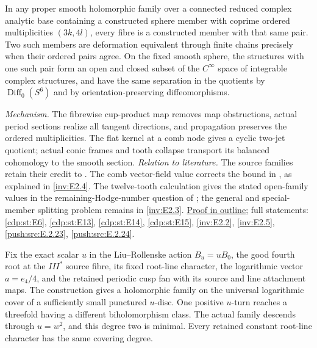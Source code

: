 \begin{maintheorem}
In any proper smooth holomorphic family over a connected reduced
complex analytic base containing a constructed sphere member with
coprime ordered multiplicities $(3k,4l)$, every fibre is a
constructed member with that same pair. Two such members are
deformation equivalent through finite chains precisely when their
ordered pairs agree. On the fixed smooth sphere, the structures
with one such pair form an open and closed subset of the
$C^\infty$ space of integrable complex structures, and have the
same separation in the quotients by $\operatorname{Diff}_0(S^6)$
and by orientation-preserving diffeomorphisms.

\end{maintheorem}

\textit{Mechanism.} The fibrewise cup-product map removes map
obstructions, actual period sections realize all tangent
directions, and propagation preserves the ordered multiplicities.
The flat kernel at a comb node gives a cyclic two-jet quotient;
actual conic frames and tooth collapse transport its balanced
cohomology to the smooth section.
\textit{Relation to literature.} The source families retain their
credit to \cite{Viaclovsky2026Two,LiuRollenske2026,Viaclovsky2026Combs}.
The comb vector-field value corrects the bound in
\cite[Corollary~1.3, p.~2]{HKP2000}, as explained in
\ref{inv:E2.4}.
The twelve-tooth calculation gives the stated open-family values
in the remaining-Hodge-number question of
\cite[Section~10(2)]{Viaclovsky2026Combs}; the general and
special-member splitting problem remains in \ref{inv:E2.3}.
\hyperlink{outline-II-F}{Proof in outline}; full statements:
\ref{cdp:st:E6}, \ref{cdp:st:E13}, \ref{cdp:st:E14},
\ref{cdp:st:E15}, \ref{inv:E2.2}, \ref{inv:E2.5},
\ref{push:src:E.2.23}, \ref{push:src:E.2.24}.

\hypertarget{main-II-G}{}
\begin{maintheorem}
\hypertarget{tag-03K8}{}\label{series:II:G}

Fix the exact scalar $u$ in the Liu--Rollenske action $B_u=uB_0$,
the good fourth root at the $III^*$ source fibre, its fixed
root-line character, the logarithmic vector $a=e_4/4$, and the
retained periodic cusp fan with its source and line attachment
maps. The construction gives a holomorphic family on the universal
logarithmic cover of a sufficiently small punctured $u$-disc.
One positive $u$-turn reaches a threefold having a different
biholomorphism class. The actual family descends through
$u=w^2$, and this degree two is minimal. Every retained constant
root-line character has the same covering degree.

\end{maintheorem}

